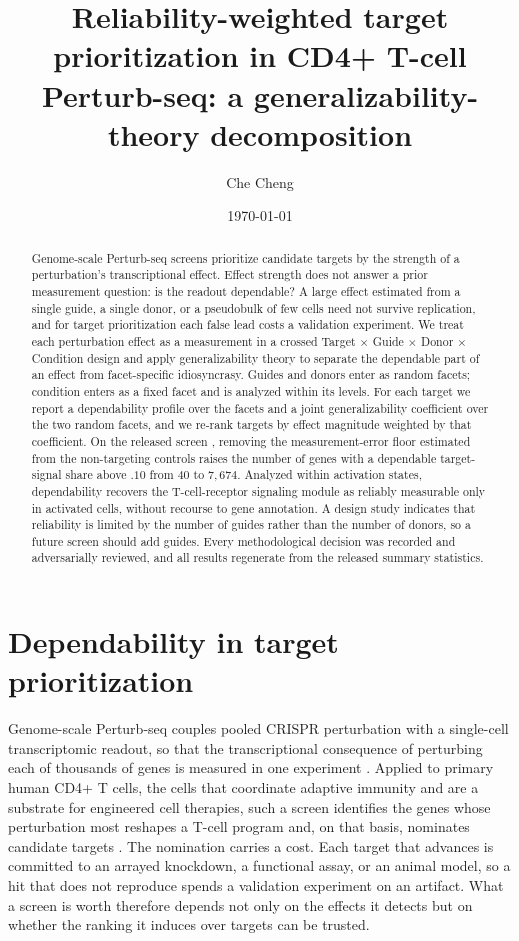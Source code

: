 \documentclass[11pt]{article}
\title{\textbf{Reliability-weighted target prioritization in CD4+ T-cell
Perturb-seq: a generalizability-theory decomposition}}
\author[1]{Che Cheng}
\affil[1]{Institute of Statistical Science, Academia Sinica, Taipei, Taiwan.
\texttt{che830621@as.edu.tw}. ORCID 0000-0003-3376-7833.}
\date{\today}
\begin{document}
\maketitle

\begin{abstract}
\noindent Genome-scale Perturb-seq screens prioritize candidate targets by the
strength of a perturbation's transcriptional effect. Effect strength does not
answer a prior measurement question: is the readout dependable? A large effect
estimated from a single guide, a single donor, or a pseudobulk of few cells need
not survive replication, and for target prioritization each false lead costs a
validation experiment. We treat each perturbation effect as a measurement in a
crossed Target $\times$ Guide $\times$ Donor $\times$ Condition design and apply
generalizability theory \parencite{cronbach1972, brennan2001} to separate the dependable part
of an effect from facet-specific idiosyncrasy. Guides and donors enter as random
facets; condition enters as a fixed facet and is analyzed within its levels. For
each target we report a dependability profile over the facets and a joint
generalizability coefficient over the two random facets, and we re-rank targets
by effect magnitude weighted by that coefficient. On the released screen
\parencite{zhu2025}, removing the measurement-error floor estimated from the
non-targeting controls raises the number of genes with a dependable target-signal
share above $.10$ from $40$ to $7{,}674$. Analyzed within activation states,
dependability recovers the T-cell-receptor signaling module as reliably measurable
only in activated cells, without recourse to gene annotation. A design study
indicates that reliability is limited by the number of guides rather than the
number of donors, so a future screen should add guides. Every methodological decision was recorded and adversarially
reviewed, and all results regenerate from the released summary statistics.
\end{abstract}

\section{Dependability in target prioritization}

Genome-scale Perturb-seq couples pooled CRISPR perturbation with a single-cell
transcriptomic readout, so that the transcriptional consequence of perturbing each
of thousands of genes is measured in one experiment
\parencite{dixit2016,replogle2022}. Applied to primary human CD4+ T cells, the
cells that coordinate adaptive immunity and are a substrate for engineered cell
therapies, such a screen identifies the genes whose perturbation most reshapes a
T-cell program and, on that basis, nominates candidate targets
\parencite{zhu2025}. The nomination carries a cost. Each target that advances is
committed to an arrayed knockdown, a functional assay, or an animal model, so a
hit that does not reproduce spends a validation experiment on an artifact. What a
screen is worth therefore depends not only on the effects it detects but on
whether the ranking it induces over targets can be trusted.
\end{document}
